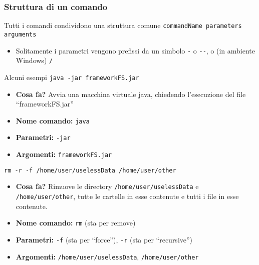 \documentclass{beamer}
\begin{document}
\begin{frame}[fragile]
\frametitle{Struttura di un comando}
\begin{block}{Tutti i comandi condividono una struttura comune}
\texttt{commandName parameters arguments} 
\end{block}
\begin{itemize}
 \item Solitamente i parametri vengono prefissi da un simbolo \texttt{-} o \texttt{-{}-}, o (in ambiente Windows) \texttt{/}
\end{itemize}
\begin{block}{Alcuni esempi}
\texttt{java -jar frameworkFS.jar} 
\scriptsize
\begin{itemize}
 \item \textbf{Cosa fa?} Avvia una macchina virtuale java, chiedendo l'esecuzione del file ``frameworkFS.jar''
 \item \textbf{Nome comando:} \texttt{java}
 \item \textbf{Parametri:} \texttt{-jar}
 \item \textbf{Argomenti:} \texttt{frameworkFS.jar}
\end{itemize}
\normalsize
\texttt{rm -r -f /home/user/uselessData /home/user/other} 
\scriptsize
\begin{itemize}
 \item \textbf{Cosa fa?} Rimuove le directory \texttt{/home/user/uselessData} e \texttt{/home/user/other}, tutte le cartelle in esse contenute e tutti i file in esse contenute.
 \item \textbf{Nome comando:} \texttt{rm} (sta per remove)
 \item \textbf{Parametri:} \texttt{-f} (sta per ``force''), \texttt{-r} (sta per ``recursive'')
 \item \textbf{Argomenti:} \texttt{/home/user/uselessData}, \texttt{/home/user/other}
\end{itemize}
\end{block}
\normalsize
\end{frame}
\end{document}
